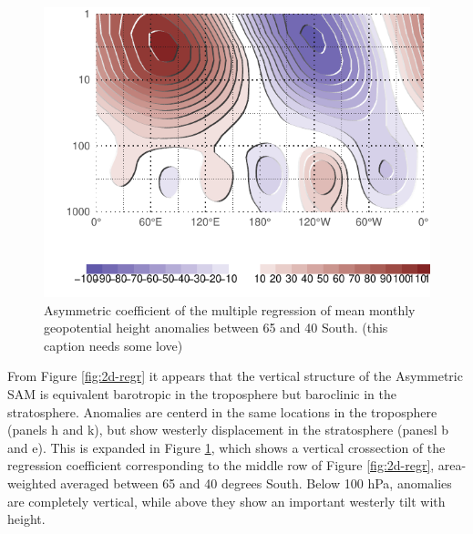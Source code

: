 \documentclass[]{ametsocV5}
\begin{document}
\begin{figure}
\includegraphics{vertical-regression-1} \caption[Asymmetric coefficient of the multiple regression of mean monthly geopotential height anomalies between 65 and 40 South]{Asymmetric coefficient of the multiple regression of mean monthly geopotential height anomalies between 65 and 40 South. (this caption needs some love)}\label{fig:vertical-regression}
\end{figure}

From Figure \ref{fig:2d-regr} it appears that the vertical structure of
the Asymmetric SAM is equivalent barotropic in the troposphere but
baroclinic in the stratosphere. Anomalies are centerd in the same
locations in the troposphere (panels h and k), but show westerly
displacement in the stratosphere (panesl b and e). This is expanded in
Figure \ref{fig:vertical-regression}, which shows a vertical crossection
of the regression coefficient corresponding to the middle row of Figure
\ref{fig:2d-regr}, area-weighted averaged between 65 and 40 degrees
South. Below 100 hPa, anomalies are completely vertical, while above
they show an important westerly tilt with height.
\end{document}

